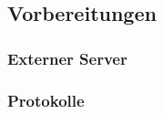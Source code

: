\subsection{Vorbereitungen}
\label{subsec:vorbereitungen}

\subsubsection{Externer Server}

\subsubsection{Protokolle}

